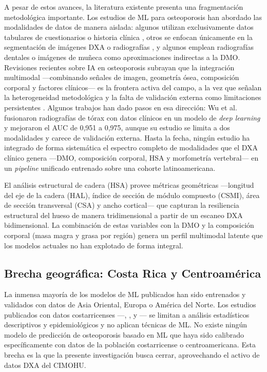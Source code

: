 \documentclass[../tesis.tex]{subfiles}
\begin{document}
A pesar de estos avances, la literatura existente presenta una fragmentación metodológica importante. Los estudios de ML para osteoporosis han abordado las modalidades de datos de manera aislada: algunos utilizan exclusivamente datos tabulares de cuestionarios o historia clínica \parencite{Yoo2013, Je2025}, otros se enfocan únicamente en la segmentación de imágenes DXA o radiografías \cite{Hussain2024}, y algunos emplean radiografías dentales o imágenes de muñeca como aproximaciones indirectas a la DMO\@. Revisiones recientes sobre IA en osteoporosis subrayan que la integración multimodal ---combinando señales de imagen, geometría ósea, composición corporal y factores clínicos--- es la frontera activa del campo, a la vez que señalan la heterogeneidad metodológica y la falta de validación externa como limitaciones persistentes \parencite{Ong2023, Conforti2026}. Algunos trabajos han dado pasos en esa dirección: Wu et al.\ \parencite{Wu2025multimodal} fusionaron radiografías de tórax con datos clínicos en un modelo de \textit{deep learning} y mejoraron el AUC de 0{,}951 a 0{,}975, aunque su estudio se limita a dos modalidades y carece de validación externa. Hasta la fecha, ningún estudio ha integrado de forma sistemática el espectro completo de modalidades que el DXA clínico genera ---DMO, composición corporal, HSA y morfometría vertebral--- en un \textit{pipeline} unificado entrenado sobre una cohorte latinoamericana.

El análisis estructural de cadera (HSA) provee métricas geométricas ---longitud del eje de la cadera (HAL), índice de sección de módulo compuesto (CSMI), área de sección transversal (CSA) y ancho cortical--- que capturan la resiliencia estructural del hueso de manera tridimensional a partir de un escaneo DXA bidimensional. La combinación de estas variables con la DMO y la composición corporal (masa magra y grasa por región) genera un perfil multimodal latente que los modelos actuales no han explotado de forma integral.

\subsection{Brecha geográfica: Costa Rica y Centroamérica}

La inmensa mayoría de los modelos de ML publicados han sido entrenados y validados con datos de Asia Oriental, Europa o América del Norte. Los estudios publicados con datos costarricenses ---\textcite{CastroGamboa2022}, \textcite{Moncada2023}, \textcite{Montiel2023} y \textcite{CerdasPerez2026}--- se limitan a análisis estadísticos descriptivos y epidemiológicos y no aplican técnicas de ML\@. No existe ningún modelo de predicción de osteoporosis basado en ML que haya sido calibrado específicamente con datos de la población costarricense o centroamericana. Esta brecha es la que la presente investigación busca cerrar, aprovechando el activo de datos DXA del CIMOHU.
\end{document}
